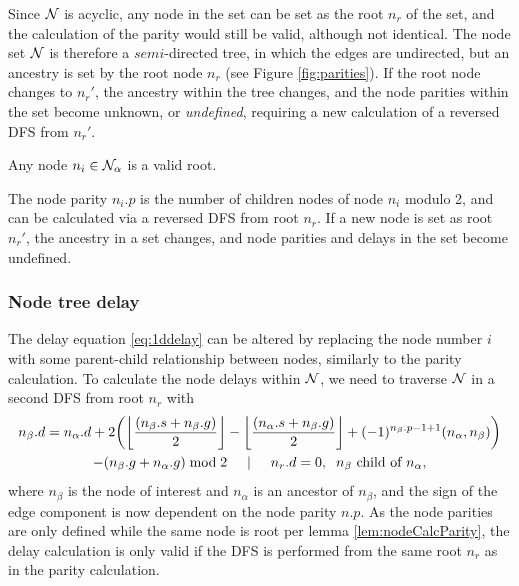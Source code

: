Since $\mathcal{N}$ is acyclic, any node in the set can be set as the root $n_r$ of the set, and the calculation of the parity would still be valid, although not identical. The node set $\mathcal{N}$ is therefore a $semi$-directed tree, in which the edges are undirected, but an ancestry is set by the root node $n_r$ (see Figure \ref{fig:parities}). If the root node changes to $n_{r}'$, the ancestry within the tree changes, and the node parities within the set become unknown, or \emph{undefined}, requiring a new calculation of a reversed DFS from $n_{r}'$.

\begin{lemma}\label{lem:anynoderoot}
  Any node $n_i \in \mathcal{N}_\alpha$ is a valid root.
\end{lemma}

\begin{lemma}\label{lem:nodeCalcParity}
  The node parity $n_i.p$ is the number of children nodes of node $n_i$ modulo 2, and can be calculated via a reversed DFS from root $n_r$. If a new node is set as root $n_r'$, the ancestry in a set changes, and node parities and delays in the set become undefined.
\end{lemma}

\subsubsection{Node tree delay}

The delay equation \eqref{eq:1ddelay} can be altered by replacing the node number $i$ with some parent-child relationship between nodes, similarly to the parity calculation. To calculate the node delays within $\mathcal{N}$, we need to traverse $\mathcal{N}$ in a second DFS from root $n_r$ with
\begin{multline}\label{eq:2ddelay}
  n_\beta.d = n_\alpha.d + 2\bigg({\left \lfloor \frac{(n_\beta.s+n_\beta.g)}{2} \right \rfloor } - {\left \lfloor \frac{(n_\alpha.s+n_\beta.g)}{2} \right \rfloor } + (-1)^{n_\beta.p-1+1}(n_\alpha,n_\beta)\bigg) \\
         - (n_\beta.g + n_\alpha.g)\bmod 2 \hspace{.5cm} | \hspace{.5cm} n_r.d = 0, \hspace{.2cm} n_\beta \mbox{ child of } n_\alpha,
\end{multline}
where $n_\beta$ is the node of interest and $n_\alpha$ is an ancestor of $n_\beta$, and the sign of the edge component is now dependent on the node parity $n.p$. As the node parities are only defined while the same node is root per lemma \ref{lem:nodeCalcParity}, the delay calculation is only valid if the DFS is performed from the same root $n_r$ as in the parity calculation.

